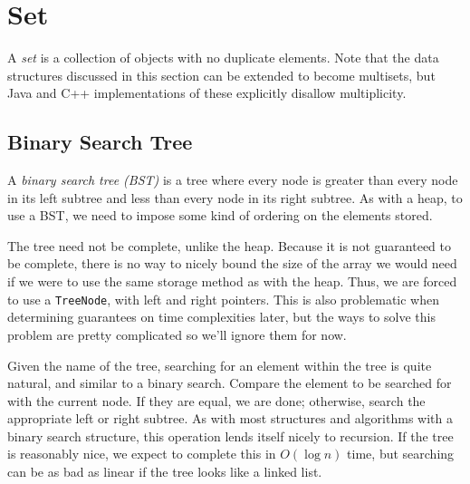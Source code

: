 \section{Set}

A \textit{set} is a collection of objects with no duplicate elements. Note that the data structures discussed in this section can be extended to become multisets, but Java and C++ implementations of these explicitly disallow multiplicity.

\subsection{Binary Search Tree}

A \textit{binary search tree (BST)} is a tree where every node is greater than every node in its left subtree and less than every node in its right subtree. As with a heap, to use a BST, we need to impose some kind of ordering on the elements stored.

\begin{center}
\end{center}

The tree need not be complete, unlike the heap. Because it is not guaranteed to be complete, there is no way to nicely bound the size of the array we would need if we were to use the same storage method as with the heap. Thus, we are forced to use a \texttt{TreeNode}, with left and right pointers. This is also problematic when determining guarantees on time complexities later, but the ways to solve this problem are pretty complicated so we'll ignore them for now.

Given the name of the tree, searching for an element within the tree is quite natural, and similar to a binary search. Compare the element to be searched for with the current node. If they are equal, we are done; otherwise, search the appropriate left or right subtree. As with most structures and algorithms with a binary search structure, this operation lends itself nicely to recursion. If the tree is reasonably nice, we expect to complete this in $O(\log{n})$ time, but searching can be as bad as linear if the tree looks like a linked list.


